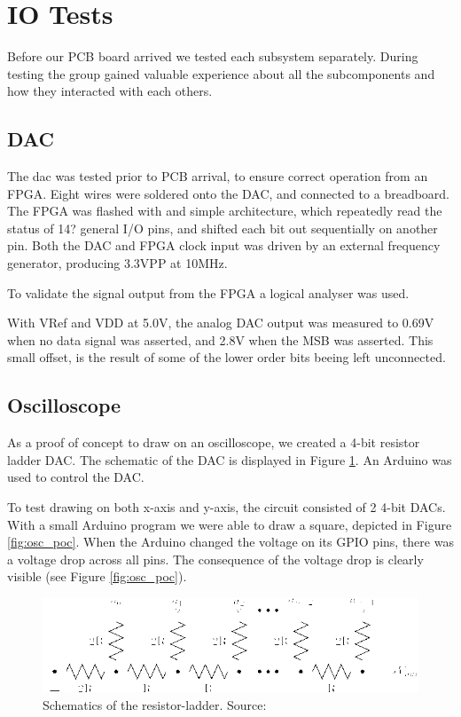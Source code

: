 \section{IO Tests}
Before our PCB board arrived we tested each subsystem separately.
During testing the group gained valuable experience about all the subcomponents and how they interacted with each others.

\subsection{DAC}
The dac was tested prior to PCB arrival, to ensure correct operation from an FPGA.
Eight wires were soldered onto the DAC, and connected to a breadboard.
The FPGA was flashed with and simple architecture, which repeatedly read the status of 14? general I/O pins, and shifted each bit out sequentially on another pin.
Both the DAC and FPGA clock input was driven by an external frequency generator, producing 3.3VPP at 10MHz.

To validate the signal output from the FPGA a logical analyser was used.

With VRef and VDD at 5.0V, the analog DAC output was measured to 0.69V when no data signal was asserted, and 2.8V when the MSB was asserted. This small offset, is the result of some of the lower order bits beeing left unconnected.

\subsection{Oscilloscope}
As a proof of concept to draw on an oscilloscope, we created a 4-bit resistor ladder DAC. The schematic of the DAC is displayed in Figure \ref{fig:r2r-ladder}.
An Arduino was used to control the DAC.

To test drawing on both x-axis and y-axis, the circuit consisted of 2 4-bit DACs.
With a small Arduino program we were able to draw a square, depicted in Figure \ref{fig:osc_poc}.
When the Arduino changed the voltage on its GPIO pins, there was a voltage drop across all pins.
The consequence of the voltage drop is clearly visible (see Figure \ref{fig:osc_poc}).


\begin{figure}[h]
\includegraphics[width=\columnwidth]{images/r2r-ladder}
\centering
\caption{Schematics of the resistor-ladder. Source: \cite{r2r-ladder-schematics}}
\label{fig:r2r-ladder}
\end{figure}

